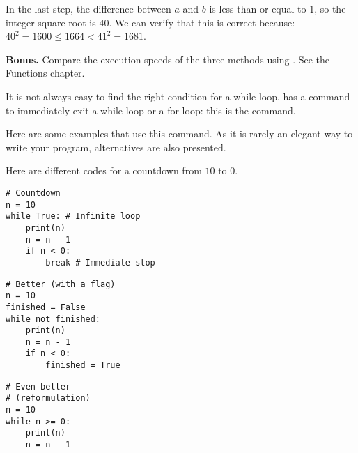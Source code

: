 \documentclass[11pt,class=report,crop=false]{standalone}
\begin{document}
\begin{activite}
\begin{enumerate}
\medskip

In the last step, the difference between $a$ and $b$ is less than or equal to $1$, so the integer square root is $40$. We can verify that this is correct because: $40^2 = 1600 \le 1664 < 41^2 = 1681$.
    
\end{enumerate}  
  
  
\textbf{Bonus.} Compare the execution speeds of the three methods using . See the \og{}Functions\fg{} chapter.

\end{activite}



\begin{cours}

It is not always easy to find the right condition for a \og{}while\fg{} loop. \Python{} has a command to immediately exit a \og{}while\fg{} loop
or a \og{}for\fg{} loop: this is the  command.

Here are some examples that use this  command. As it is rarely an elegant way to write your program, alternatives are also presented.

\begin{exemple}

Here are different codes for a countdown from $10$ to $0$.

\begin{minipage}{0.35\textwidth}
\begin{lstlisting}
# Countdown
n = 10
while True: # Infinite loop
    print(n)
    n = n - 1
    if n < 0:
        break # Immediate stop
\end{lstlisting}
\end{minipage}\qquad\qquad
\begin{minipage}{0.35\textwidth}
\begin{lstlisting}
# Better (with a flag)
n = 10
finished = False
while not finished:
    print(n)
    n = n - 1   
    if n < 0:
        finished = True
\end{lstlisting}
\end{minipage}
\begin{minipage}{0.2\textwidth}
\begin{lstlisting}
# Even better 
# (reformulation)
n = 10
while n >= 0:
    print(n)
    n = n - 1
\end{lstlisting}
\end{minipage}
\end{exemple}


\end{cours}
\end{document}
